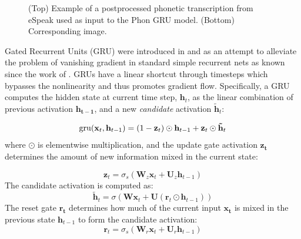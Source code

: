 \begin{figure}
\begin{minipage}[r]{0.45\textwidth}
  \caption{(Top) Example of a postprocessed phonetic transcription
    from eSpeak used as input to the {\sc Phon GRU} model. (Bottom)
    Corresponding image.}
  \label{fig:ipa}
\end{minipage}
\end{figure}

Gated Recurrent Units (GRU) were introduced in
 and  as an
attempt to alleviate the problem of vanishing gradient in standard
simple recurrent nets as known since the work of
. GRUs have a linear shortcut through
timesteps which bypasses the nonlinearity and thus promotes gradient
flow.
Specifically, a GRU computes the hidden state at current time step, $\mathbf{h}_{t}$, as the
linear combination of previous activation $\mathbf{h_{t-1}}$, and a new
{\it candidate} activation $\mathbf{\tilde{h}}_t$:
%

\begin{equation}
  \mathrm{gru}(\mathbf{x}_t, \mathbf{h}_{t-1}) = (1 - \mathbf{z}_t)\odot \mathbf{h}_{t-1} + \mathbf{z}_t \odot \mathbf{\tilde{h}}_t
\vspace{-.1cm}
\end{equation}
%
where $\odot$ is elementwise multiplication, and the update gate
activation $\mathbf{z_{t}}$ determines the amount of new information
mixed in the current state:
%

\begin{equation}
\label{eq:gru-update}
   \mathbf{z}_t = \sigma_s(\mathbf{W}_z \mathbf{x}_t + \mathbf{U}_z \mathbf{h}_{t-1})
\end{equation}
%
The candidate activation is computed as:
%
\begin{equation}
\label{eq:gru-cand}
   \mathbf{\tilde{h}}_t = \sigma(\mathbf{W} \mathbf{x}_t + \mathbf{U}(\mathbf{r}_t \odot \mathbf{h}_{t-1}))
\end{equation}
%
The reset gate $\mathbf{r_{t}}$ determines how much of the current
input $\mathbf{x_{t}}$ is mixed in the previous state
$\mathbf{h}_{t-1}$ to form the candidate activation:
%
\begin{equation}
\label{eq:gru-reset}
   \mathbf{r}_t = \sigma_s(\mathbf{W}_r \mathbf{x}_t + \mathbf{U}_r \mathbf{h}_{t-1})
\end{equation}

